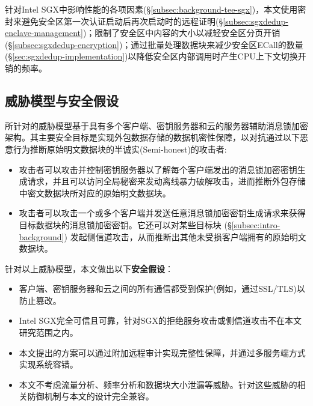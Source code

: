 针对Intel SGX中影响性能的各项因素(\S\ref{subsec:background-tee-sgx})，本文使用密封来避免安全区第一次认证启动后再次启动时的远程证明(\S\ref{subsec:sgxdedup-enclave-management})；限制了安全区中内容的大小以减轻安全区分页开销(\S\ref{subsec:sgxdedup-encryption})；通过批量处理数据块来减少安全区ECall的数量(\S\ref{sec:sgxdedup-implementation})以降低安全区内部调用时产生CPU上下文切换开销的频率。

\subsection{威胁模型与安全假设}
\label{subsec:sgxdedup-threat}

\sysnameS 所针对的威胁模型基于具有多个客户端、密钥服务器和云的服务器辅助消息锁加密架构。其主要安全目标是实现外包数据存储的数据机密性保障，以对抗通过以下恶意行为推断原始明文数据块的半诚实(Semi-honest)的攻击者:

\begin{itemize}[leftmargin=0em]
  \item 攻击者可以攻击并控制密钥服务器以了解每个客户端发出的消息锁加密密钥生成请求，并且可以访问全局秘密来发动离线暴力破解攻击，进而推断外包存储中密文数据块所对应的原始明文数据块。
  \item 攻击者可以攻击一个或多个客户端并发送任意消息锁加密密钥生成请求来获得目标数据块的消息锁加密密钥。它还可以对某些目标块  (\S\ref{subsec:intro-background}) 发起侧信道攻击，从而推断出其他未受损客户端拥有的原始明文数据块。
\end{itemize}

针对以上威胁模型，本文做出以下\textbf{安全假设}：

\begin{itemize}[leftmargin=0em]
  \item 客户端、密钥服务器和云之间的所有通信都受到保护(例如，通过SSL/TLS)以防止篡改。
  \item Intel SGX完全可信且可靠，针对SGX的拒绝服务攻击或侧信道攻击不在本文研究范围之内。
  \item 本文提出的方案可以通过附加远程审计实现完整性保障，并通过多服务端方式实现系统容错。
  \item 本文不考虑流量分析、频率分析和数据块大小泄漏等威胁。针对这些威胁的相关防御机制与本文的设计完全兼容。
\end{itemize}